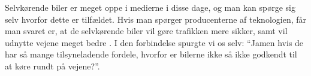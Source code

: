 Selvkørende biler er meget oppe i medierne i disse dage, og man kan spørge sig selv hvorfor dette er tilfældet. Hvis man spørger producenterne af teknologien, får man svaret er, at de selvkørende biler vil gøre trafikken mere sikker, samt vil udnytte vejene meget bedre \cite{GOOG_SITE}. I den forbindelse spurgte vi os selv: ``Jamen hvis de har så mange tilsyneladende fordele, hvorfor er bilerne ikke så ikke godkendt til at køre rundt på vejene?''. 